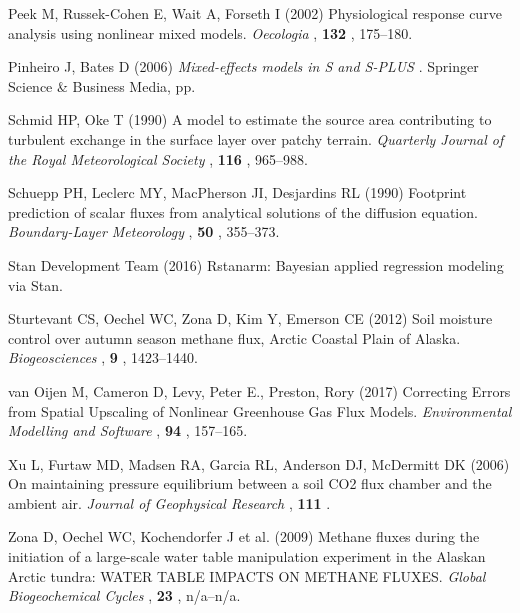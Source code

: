 \hypertarget{ref-Peek2002}{}
Peek M, Russek-Cohen E, Wait A, Forseth I (2002) Physiological response
curve analysis using nonlinear mixed models. \emph{Oecologia} ,
\textbf{132} , 175--180.

\hypertarget{ref-Pinheiro2006}{}
Pinheiro J, Bates D (2006) \emph{\textup{Mixed-effects models in S and
S-PLUS}} . Springer Science \& Business Media, pp.

\hypertarget{ref-Schmid1990}{}
Schmid HP, Oke T (1990) A model to estimate the source area contributing
to turbulent exchange in the surface layer over patchy terrain.
\emph{Quarterly Journal of the Royal Meteorological Society} ,
\textbf{116} , 965--988.

\hypertarget{ref-Schuepp1990}{}
Schuepp PH, Leclerc MY, MacPherson JI, Desjardins RL (1990) Footprint
prediction of scalar fluxes from analytical solutions of the diffusion
equation. \emph{Boundary-Layer Meteorology} , \textbf{50} , 355--373.

\hypertarget{ref-StanDevelopmentTeam2016}{}
Stan Development Team (2016) Rstanarm: Bayesian applied regression
modeling via Stan.

\hypertarget{ref-Sturtevant2012}{}
Sturtevant CS, Oechel WC, Zona D, Kim Y, Emerson CE (2012) Soil moisture
control over autumn season methane flux, Arctic Coastal Plain of Alaska.
\emph{Biogeosciences} , \textbf{9} , 1423--1440.

\hypertarget{ref-vanOijen2017}{}
van Oijen M, Cameron D, Levy, Peter E., Preston, Rory (2017) Correcting
Errors from Spatial Upscaling of Nonlinear Greenhouse Gas Flux Models.
\emph{Environmental Modelling and Software} , \textbf{94} , 157--165.

\hypertarget{ref-Xu2006}{}
Xu L, Furtaw MD, Madsen RA, Garcia RL, Anderson DJ, McDermitt DK (2006)
On maintaining pressure equilibrium between a soil CO2 flux chamber and
the ambient air. \emph{Journal of Geophysical Research} , \textbf{111} .

\hypertarget{ref-Zona2009}{}
Zona D, Oechel WC, Kochendorfer J et al. (2009) Methane fluxes during
the initiation of a large-scale water table manipulation experiment in
the Alaskan Arctic tundra: WATER TABLE IMPACTS ON METHANE FLUXES.
\emph{Global Biogeochemical Cycles} , \textbf{23} , n/a--n/a.